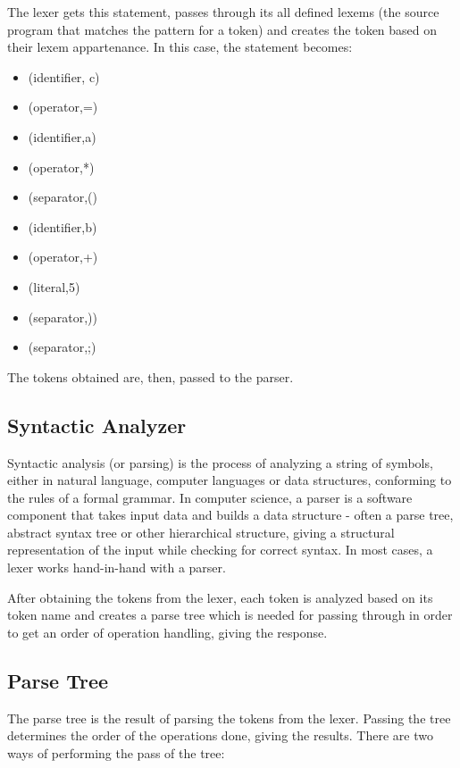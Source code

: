 \documentclass[12pt,a4paper,twoside]{report}
\begin{document}
	The lexer gets this statement, passes through its all defined lexems (the source program that matches the pattern for a token) and creates the token based on their lexem appartenance. In this case, the statement becomes:
	\begin{itemize}
			
	\item (identifier, c)
	\item (operator,=)
	\item (identifier,a)
	\item (operator,*)
	\item (separator,()
	\item (identifier,b)
	\item (operator,+)
	\item (literal,5)
	\item (separator,))
	\item (separator,;)
	\end{itemize}

	The tokens obtained are, then, passed to the parser.
	
\subsection{Syntactic Analyzer}
	Syntactic analysis (or parsing) is the process of analyzing a string of symbols, either in natural language, computer languages or data structures, conforming to the rules of a formal grammar. In computer science, a parser is a software component that takes input data and builds a data structure - often a parse tree, abstract syntax tree or other hierarchical structure, giving a structural representation of the input while checking for correct syntax. In most cases, a lexer works hand-in-hand with a parser.
	
	After obtaining the tokens from the lexer, each token is analyzed based on its token name and creates a parse tree which is needed for passing through in order to get an order of operation handling, giving the response. 
\subsection{Parse Tree}
 	
 	The parse tree is the result of parsing the tokens from the lexer. Passing the tree determines the order of the operations done, giving the results. There are two ways of performing the pass of the tree:
 	
\end{document}
